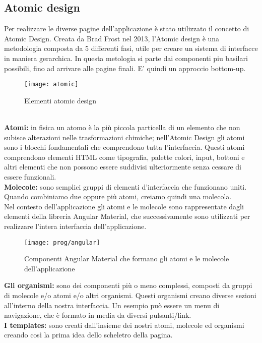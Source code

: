 \subsection{Atomic design}
Per realizzare le diverse pagine dell'applicazione è stato utilizzato il concetto di Atomic Design.
Creata da Brad Frost nel 2013, l'Atomic design è una metodologia composta da 5 differenti fasi, utile per creare un sistema di interfacce in maniera gerarchica. In questa metologia si parte dai componenti piu basilari possibili, fino ad arrivare alle pagine finali. E' quindi un approccio bottom-up.
\begin{figure}[!h] 
	\centering 
	\texttt{[image: atomic]} 
	\caption{Elementi atomic design}
\end{figure}
\\

\textbf{Atomi:} in fisica un atomo è la più piccola particella di un elemento che non subisce alterazioni nelle trasformazioni chimiche; nell’Atomic Design gli atomi sono i blocchi fondamentali che comprendono tutta l’interfaccia.
Questi atomi comprendono elementi HTML come tipografia, palette colori, input, bottoni e altri elementi che non possono essere suddivisi ulteriormente senza cessare di essere funzionali.
\\

\textbf{Molecole:} sono semplici gruppi di elementi d'interfaccia che funzionano uniti. Quando combiniamo due oppure più atomi, creiamo quindi una molecola.
\\

Nel contesto dell'applicazione gli atomi e le molecole sono rappresentate dagli elementi della libreria Angular Material, che successivamente sono utilizzati per realizzare l'intera interfaccia dell'applicazione.

\begin{figure}[!h] 
	\centering 
	\texttt{[image: prog/angular]} 
	\caption{Componenti Angular Material che formano gli atomi e le molecole dell'applicazione}
\end{figure} 

\textbf{Gli organismi:} sono dei componenti più o meno complessi, composti da gruppi di molecole e/o atomi e/o altri organismi. Questi organismi creano diverse sezioni all'interno della nostra interfaccia. Un esempio può essere un menu di navigazione, che è formato in media da diversi pulsanti/link. 
\\

\textbf{I templates:} sono creati dall'insieme dei nostri atomi, molecole ed organismi creando così la prima idea dello scheletro della pagina.
\\

